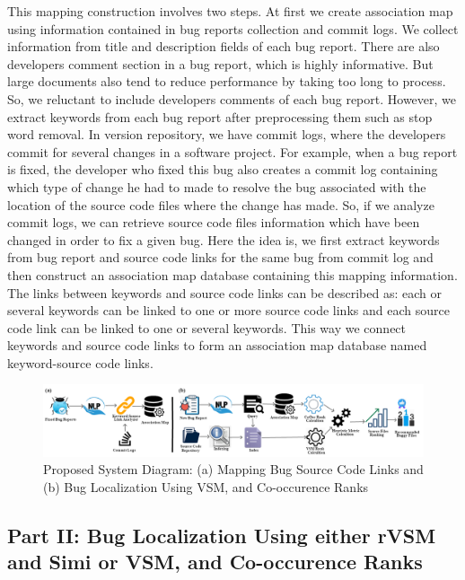 \documentclass[conference]{IEEEtran}
\begin{document}
This mapping construction involves two steps.
At first we create association map using information contained in bug reports collection and commit logs. We collect information from title and description fields of each bug report. There are also developers comment section in a bug report, which is highly informative. But large documents also tend to reduce performance by taking too long to process. So, we reluctant to include developers comments of each bug report. However, we extract keywords from each bug report after preprocessing them such as stop word removal. 
In version repository, we have commit logs, where the developers commit for several changes in a software project. For example, when a bug report is fixed, the developer who fixed this bug also creates a commit log containing which type of change he had to made to resolve the bug associated with the location of the source code files where the change has made. So, if we analyze commit logs, we can retrieve source code files information which have been changed in order to fix a given bug. Here the idea is, we first extract keywords from bug report and source code links for the same bug from commit log and then construct an association map database containing this mapping information. The links between keywords and source code links can be described as: each or several keywords can be linked to one or more source code links and each source code link can be linked to one or several keywords. This way we connect keywords and source code links to form an association map database named keyword-source code links. 




\begin{figure}
	\centering
	\includegraphics[scale=0.65]{SD3}
	\caption{Proposed System Diagram: (a) Mapping Bug Source Code Links and  (b) Bug Localization Using VSM, and Co-occurence Ranks}
	\label{fig:systemDiagram}
\end{figure}

\subsection{Part II: Bug Localization Using either rVSM and Simi or VSM, and Co-occurence Ranks}
\end{document}
